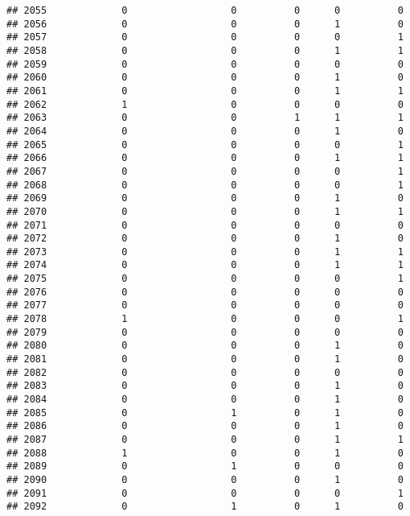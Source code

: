 \documentclass[
]{article}
\begin{document}
\begin{verbatim}
## 2055             0                  0          0      0          0
## 2056             0                  0          0      1          0
## 2057             0                  0          0      0          1
## 2058             0                  0          0      1          1
## 2059             0                  0          0      0          0
## 2060             0                  0          0      1          0
## 2061             0                  0          0      1          1
## 2062             1                  0          0      0          0
## 2063             0                  0          1      1          1
## 2064             0                  0          0      1          0
## 2065             0                  0          0      0          1
## 2066             0                  0          0      1          1
## 2067             0                  0          0      0          1
## 2068             0                  0          0      0          1
## 2069             0                  0          0      1          0
## 2070             0                  0          0      1          1
## 2071             0                  0          0      0          0
## 2072             0                  0          0      1          0
## 2073             0                  0          0      1          1
## 2074             0                  0          0      1          1
## 2075             0                  0          0      0          1
## 2076             0                  0          0      0          0
## 2077             0                  0          0      0          0
## 2078             1                  0          0      0          1
## 2079             0                  0          0      0          0
## 2080             0                  0          0      1          0
## 2081             0                  0          0      1          0
## 2082             0                  0          0      0          0
## 2083             0                  0          0      1          0
## 2084             0                  0          0      1          0
## 2085             0                  1          0      1          0
## 2086             0                  0          0      1          0
## 2087             0                  0          0      1          1
## 2088             1                  0          0      1          0
## 2089             0                  1          0      0          0
## 2090             0                  0          0      1          0
## 2091             0                  0          0      0          1
## 2092             0                  1          0      1          0

\end{verbatim}
\end{document}
